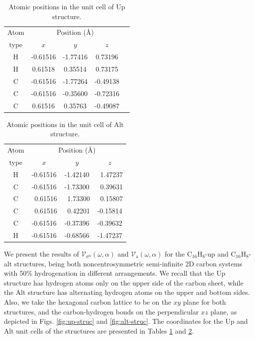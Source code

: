 \documentclass[floatfix,prb,aps,superscriptaddress,showpacs,11pt,preprint,letterpaper]{revtex4}
\begin{document}
\begin{table}[t]
\center
\begin{tabular}{ccccc}\\
\hline
\quad Atom \qquad & \multicolumn{3}{c}{Position (\AA)} \\
\cline{2-4}
\quad type \qquad & $x$ & $y$ & $z$  \\
\hline
H & -0.61516 & -1.77416 &  0.73196 \\
H &  0.61518 &  0.35514 &  0.73175 \\
C & -0.61516 & -1.77264 & -0.49138 \\
C & -0.61516 & -0.35600 & -0.72316 \\
C &  0.61516 &  0.35763 & -0.49087 \\
\hline
\end{tabular}
\caption{Atomic positions in the unit cell of Up structure. 
}
\label{tab:up-unitcell}
\end{table}
\begin{table}[t]
\center
\begin{tabular}{cccc}\\
\hline
\quad Atom \qquad & \multicolumn{3}{c}{Position (\AA)} \\
\cline{2-4}
\quad type \qquad & $x$ & $y$ & $z$  \\
\hline
H &  -0.61516 &  -1.42140 & \ 1.47237 \\
C &  -0.61516 &  -1.73300 & \ 0.39631 \\
C & \ 0.61516 & \ 1.73300 & \ 0.15807 \\
C & \ 0.61516 & \ 0.42201 &  -0.15814 \\
C &  -0.61516 &  -0.37396 &  -0.39632 \\
H &  -0.61516 &  -0.68566 &  -1.47237 \\
\hline
\end{tabular}
\caption{Atomic positions in the unit cell of Alt structure. 
}
\label{tab:alt-unitcell}
\end{table}

We present the results of $\mathcal{V}_{\sigma^{\mathrm{b}}}(\omega,\alpha)$ and
$\mathcal{V}_{\mathrm{a}}(\omega,\alpha)$ for the C$_{16}$H$_{8}$-up  and
C$_{16}$H$_{8}$-alt structures, being both noncentrosymmetric semi-infinite 2D
carbon systems with 50\% hydrogenation in different arrangements. We recall that
the Up structure has hydrogen atoms only on the upper side of the carbon sheet,
while the Alt structure has alternating hydrogen atoms on the upper and bottom
sides. Also, we take the hexagonal carbon lattice to be on the $xy$ plane for
both structures, and the carbon-hydrogen bonds on the perpendicular $xz$ plane,
as depicted in Figs. \ref{fig:up-struc} and \ref{fig:alt-struc}. The coordinates
for the Up and Alt unit cells of the structures are presented in Tables 
\ref{tab:up-unitcell} and \ref{tab:alt-unitcell}.
\end{document}
